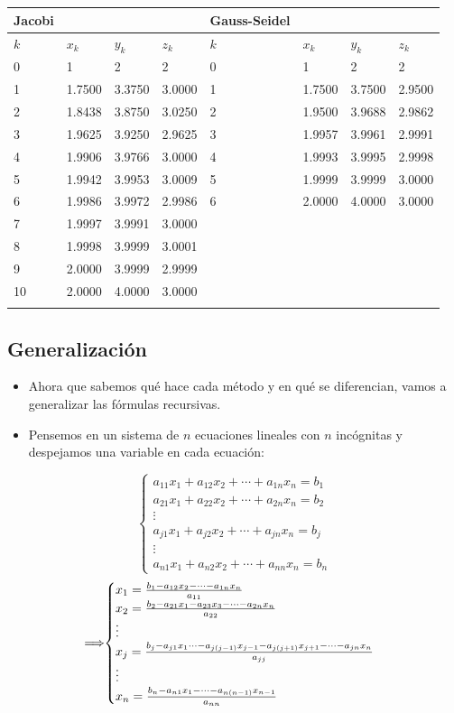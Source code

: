 \documentclass[openany]{book}
\providecommand{\tightlist}{%
  \setlength{\itemsep}{0pt}\setlength{\parskip}{0pt}}
\begin{document}
\begin{longtable}[]{@{}llllllll@{}}
\toprule
\textbf{Jacobi} & & & & \textbf{Gauss-Seidel} & & &\tabularnewline
\midrule
\endhead
\(k\) & \(x_k\) & \(y_k\) & \(z_k\) & \(k\) & \(x_k\) & \(y_k\) & \(z_k\)\tabularnewline
0 & 1 & 2 & 2 & 0 & 1 & 2 & 2\tabularnewline
1 & 1.7500 & 3.3750 & 3.0000 & 1 & 1.7500 & 3.7500 & 2.9500\tabularnewline
2 & 1.8438 & 3.8750 & 3.0250 & 2 & 1.9500 & 3.9688 & 2.9862\tabularnewline
3 & 1.9625 & 3.9250 & 2.9625 & 3 & 1.9957 & 3.9961 & 2.9991\tabularnewline
4 & 1.9906 & 3.9766 & 3.0000 & 4 & 1.9993 & 3.9995 & 2.9998\tabularnewline
5 & 1.9942 & 3.9953 & 3.0009 & 5 & 1.9999 & 3.9999 & 3.0000\tabularnewline
6 & 1.9986 & 3.9972 & 2.9986 & 6 & 2.0000 & 4.0000 & 3.0000\tabularnewline
7 & 1.9997 & 3.9991 & 3.0000 & & & &\tabularnewline
8 & 1.9998 & 3.9999 & 3.0001 & & & &\tabularnewline
9 & 2.0000 & 3.9999 & 2.9999 & & & &\tabularnewline
10 & 2.0000 & 4.0000 & 3.0000 & & & &\tabularnewline
& & & & & & &\tabularnewline
\bottomrule
\end{longtable}

\hypertarget{generalizaciuxf3n}{%
\subsection{Generalización}\label{generalizaciuxf3n}}

\begin{itemize}
\tightlist
\item
  Ahora que sabemos qué hace cada método y en qué se diferencian, vamos a generalizar las fórmulas recursivas.
\item
  Pensemos en un sistema de \(n\) ecuaciones lineales con \(n\) incógnitas y despejamos una variable en cada ecuación:
\end{itemize}

\[
\begin{cases} 
a_{11}x_1 + a_{12}x_2 + \cdots + a_{1n}x_n = b_1 \\
a_{21}x_1 + a_{22}x_2 + \cdots + a_{2n}x_n = b_2 \\
\vdots \\
a_{j1}x_1 + a_{j2}x_2 + \cdots + a_{jn}x_n = b_j \\
\vdots \\
a_{n1}x_1 + a_{n2}x_2 + \cdots + a_{nn}x_n = b_n
\end{cases}
\]
\[
\implies\hspace{-0.2cm}
\begin{cases} 
x_1 = \frac{b_1 - a_{12}x_2 - \cdots - a_{1n}x_n}{ a_{11}}\\
x_2 = \frac{b_2 - a_{21}x_1 - a_{23}x_3 - \cdots - a_{2n}x_n}{ a_{22}}\\
\vdots \\
x_j = \frac{b_j - a_{j1}x_1 \cdots - a_{j(j-1)}x_{j-1} - a_{j(j+1)}x_{j+1} - \cdots - a_{jn}x_n}{ a_{jj}}\\
\vdots \\
x_n = \frac{b_n - a_{n1}x_1 - \cdots - a_{n(n-1)}x_{n-1}}{a_{nn}}\\
\end{cases}
\]
\end{document}
